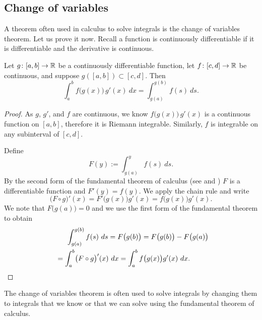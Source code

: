 \subsection{Change of variables}

A theorem often used in calculus to solve integrals is the change of
variables theorem.  Let us prove it now.  Recall 
a function is continuously differentiable if
it is differentiable and the derivative is continuous.

\begin{thm}
Let $g \colon [a,b] \to {\mathbb{R}}$ be a continuously differentiable function,
let $f \colon [c,d] \to {\mathbb{R}}$ be continuous, and suppose
$g([a,b]) \subset [c,d]$.  Then
\begin{equation*}
\int_a^b f\bigl(g(x)\bigr)\, g'(x)~ dx =
\int_{g(a)}^{g(b)} f(s)~ ds .
\end{equation*}
\end{thm}

\begin{proof}
As $g$, $g'$, and $f$ are continuous, we know $f\bigl(g(x)\bigr)\,g'(x)$
is a continuous function on $[a,b]$, therefore it is Riemann integrable.
Similarly, $f$ is integrable on any subinterval of $[c,d]$.

Define 
\begin{equation*}
F(y) := \int_{g(a)}^{y} f(s)~ds .
\end{equation*}
By the second form of the fundamental
theorem of calculus (see  and )
$F$ is a differentiable function and $F'(y) = f(y)$.  We apply the chain
rule and write
\begin{equation*}
\bigl( F \circ g \bigr)' (x) =
F'\bigl(g(x)\bigr) g'(x)
=
f\bigl(g(x)\bigr) g'(x) .
\end{equation*}
We note that $F\bigl(g(a)\bigr) = 0$ and we
use the first form of the fundamental theorem
to obtain
\begin{multline*}
\qquad %
\int_{g(a)}^{g(b)} f(s)~ds = F\bigl(g(b)\bigr) = F\bigl(g(b)\bigr)-F\bigl(g(a)\bigr)
\\
=
\int_a^b 
\bigl( F \circ g \bigr)' (x) ~dx
=
\int_a^b 
f\bigl(g(x)\bigr) g'(x)
~dx .
\qquad %
\qedhere
\end{multline*}
\end{proof}

The change of variables theorem is often used to solve integrals by changing them
to integrals that we know or that we can solve using the fundamental theorem of
calculus.

